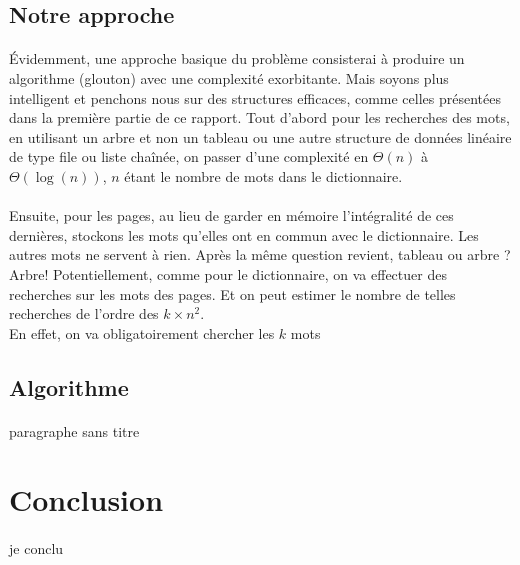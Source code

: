 \documentclass[a4paper]{article}
\begin{document}
	
		\subsection{Notre approche}
		
			\paragraph{}{
			Évidemment, une approche basique du problème consisterai à produire un algorithme (glouton) avec une complexité
			exorbitante. Mais soyons plus intelligent et penchons nous sur des structures efficaces, comme celles présentées
			dans la première partie de ce rapport. Tout d'abord pour les recherches des mots, en utilisant un arbre et non
			un tableau ou une autre structure de données linéaire de type file ou liste chaînée, on passer d'une complexité
			en $\Theta(n)$ à $\Theta(\log(n))$, $n$ étant le nombre de mots dans le dictionnaire.
			}
			\paragraph{}{
			Ensuite, pour les pages, au lieu de garder en mémoire l'intégralité de ces dernières, stockons les mots qu'elles
			ont en commun avec le dictionnaire. Les autres mots ne servent à rien. Après la même question revient, tableau
			ou arbre ? Arbre! Potentiellement, comme pour le dictionnaire, on va effectuer des recherches sur les mots des pages.
			Et on peut estimer le nombre de telles recherches de l'ordre des $k \times n^{2}$. \\
			En effet, on va obligatoirement chercher les $k$ mots
			}

		\subsection{Algorithme}
			\paragraph{}{paragraphe sans titre}	
			
	\section*{Conclusion}
		\paragraph{}{je conclu}
		
\end{document}
